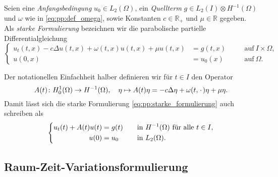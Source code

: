 \begin{Definition}
\label{definition:pp:starke_formulierung}
    Seien eine \emph{Anfangsbedingung} $u_{0} \in L_{2}(\Omega)$, ein \emph{Quellterm} $g \in L_{2}(I) \otimes H^{-1}(\Omega)$ und $\omega$ wie in \cref{eq:pp:def_omega}, sowie Konstanten $c \in \mathbb{R}_{+}$ und $\mu \in \mathbb{R}$ gegeben.
    Als \emph{starke Formulierung} bezeichnen wir die parabolische partielle Differentialgleichung
    \begin{equation}
    \label{eq:pp:starke_formulierung}
        \left\{
        \begin{aligned}
            u_{t}(t, x) - c \Delta u(t, x) + \omega(t, x) u(t, x) + \mu u(t, x) &= g(t, x) \quad &&\text{auf}~I \times \Omega,\\
            u(0, x) &= u_{0}(x) \quad &&\text{auf}~\Omega.
        \end{aligned}
        \right.
    \end{equation}
\end{Definition}

\begin{Bemerkung}
\label{bemerkung:pp:definition_operator_A}
    Der notationellen Einfachheit halber definieren wir für $t \in I$ den Operator
    \begin{equation}
    \label{eq:pp:definition_operator_A}
        A(t) \colon H^{1}_{0}(\Omega) \to H^{-1}(\Omega), \quad \eta \mapsto A(t) \eta = - c \Delta \eta + \omega(t, \blank) \eta + \mu \eta.
    \end{equation}
    Damit lässt sich die starke Formulierung \cref{eq:pp:starke_formulierung} auch schreiben als
    \begin{equation}
        \left\{
        \begin{aligned}
            u_t(t) + A(t)u(t) &= g(t) \quad &&\text{in}~H^{-1}(\Omega)~\fa t \in I,\\
            u(0) &= u_{0} \quad &&\text{in}~L_{2}(\Omega).
        \end{aligned}
        \right.
    \end{equation}
\end{Bemerkung}

\subsection{Raum-Zeit-Variationsformulierung} %
\label{sub:variationsformulierungen}


